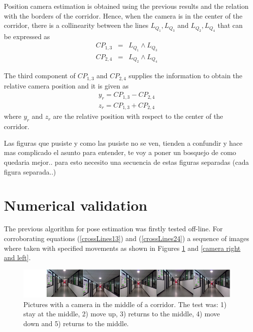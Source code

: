 \color{blue}

Position camera estimation is obtained using the previous results and the relation with the borders of the corridor. Hence, when the camera is in the center of the corridor, there is a collinearity
between the lines $L_{Q_1},L_{Q_3}$ and $L_{Q_2},L_{Q_4}$ that can be expressed as
\begin{eqnarray}
		   CP_{1,3} &=& L_{Q_1}\wedge L_{Q_3} \label{crossLines13} \\
		   CP_{2,4} &= & L_{Q_2}\wedge L_{Q_4} \label{crossLines24}
\end{eqnarray}

The third component of $CP_{1,3}$ and $CP_{2,4}$ supplies the information to obtain the relative camera position and it is given as
\begin{eqnarray}
		y_r=CP_{1,3}-CP_{2,4} \label{relaitve_x} \\
z_r=CP_{1,3}+CP_{2,4} \label{realitive_z}
\end{eqnarray}
where $y_r$ and $z_r$ are the relative position with respect to the center of the corridor. \\

\color{black}

\color{red}
Las figuras que pusiste y como las pusiste no se ven, tienden a confundir y hace mas complicado el asunto para entender, te voy a poner un bosquejo de como quedaria mejor..
para esto necesito una secuencia de estas figuras separadas (cada figura separada..)
\color{blue}

\section{Numerical validation}
%

The previous algorithm for pose estimation was firstly tested off-line. For corroborating equations (\ref{crossLines13}) and (\ref{crossLines24}) a sequence of images where taken with specified  movements as shown in Figures \ref{camera up and down} and \ref{camera right and left}.

\begin{figure} [h!]
\centering
\includegraphics[scale=0.5]{Chapter03/Images/CentreFrames_m.png}
\caption{Pictures with a camera in the middle of a corridor. The test was: 1) stay at the middle, 2) move up, 3) returns to the middle, 4) move down and 5) returns to the middle. }
\label{camera up and down}
\end{figure}


